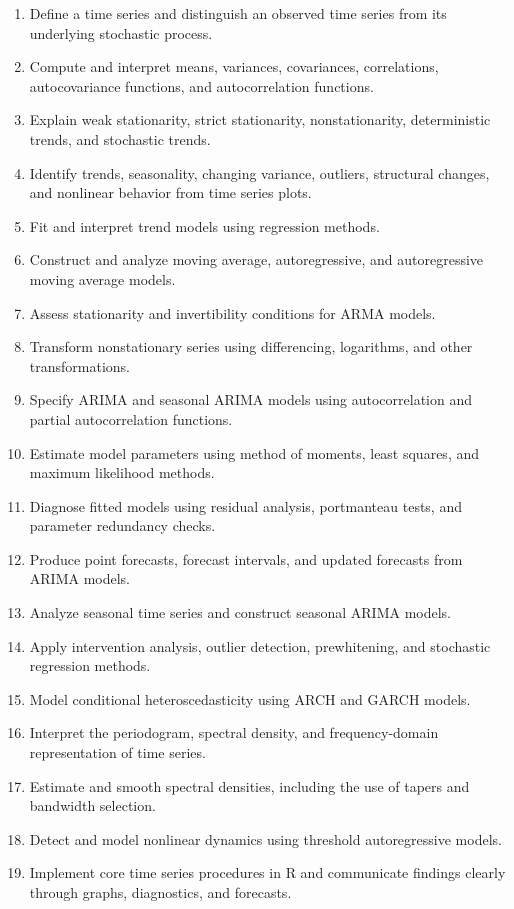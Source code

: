 \documentclass[11pt]{article}
\begin{document}
\begin{enumerate}
    \item Define a time series and distinguish an observed time series from its underlying stochastic process.
    \item Compute and interpret means, variances, covariances, correlations, autocovariance functions, and autocorrelation functions.
    \item Explain weak stationarity, strict stationarity, nonstationarity, deterministic trends, and stochastic trends.
    \item Identify trends, seasonality, changing variance, outliers, structural changes, and nonlinear behavior from time series plots.
    \item Fit and interpret trend models using regression methods.
    \item Construct and analyze moving average, autoregressive, and autoregressive moving average models.
    \item Assess stationarity and invertibility conditions for ARMA models.
    \item Transform nonstationary series using differencing, logarithms, and other transformations.
    \item Specify ARIMA and seasonal ARIMA models using autocorrelation and partial autocorrelation functions.
    \item Estimate model parameters using method of moments, least squares, and maximum likelihood methods.
    \item Diagnose fitted models using residual analysis, portmanteau tests, and parameter redundancy checks.
    \item Produce point forecasts, forecast intervals, and updated forecasts from ARIMA models.
    \item Analyze seasonal time series and construct seasonal ARIMA models.
    \item Apply intervention analysis, outlier detection, prewhitening, and stochastic regression methods.
    \item Model conditional heteroscedasticity using ARCH and GARCH models.
    \item Interpret the periodogram, spectral density, and frequency-domain representation of time series.
    \item Estimate and smooth spectral densities, including the use of tapers and bandwidth selection.
    \item Detect and model nonlinear dynamics using threshold autoregressive models.
    \item Implement core time series procedures in R and communicate findings clearly through graphs, diagnostics, and forecasts.
\end{enumerate}
\end{document}
